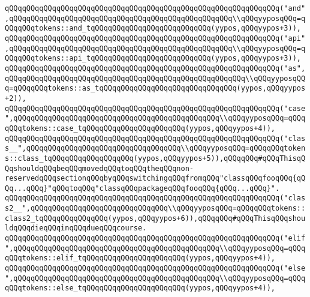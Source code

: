 \verb|qQQqqQQqqQQqqQQqqQQqqQQqqQQqqQQqqQQqqQQqqQQqqQQqqQQqqQQqqQQqqQQq("and",qQQqqQQqqQQqqQQqqQQqqQQqqQQqqQQqqQQqqQQqqQQqqQQqqQQq\\qQQqyyposqQQq=qQQqqQQqtokens::and_tqQQqqQQqqQQqqQQqqQQqqQQqqQQq(yypos,qQQqyypos+3)),|\newline
\verb|qQQqqQQqqQQqqQQqqQQqqQQqqQQqqQQqqQQqqQQqqQQqqQQqqQQqqQQqqQQqqQQq("api",qQQqqQQqqQQqqQQqqQQqqQQqqQQqqQQqqQQqqQQqqQQqqQQqqQQq\\qQQqyyposqQQq=qQQqqQQqtokens::api_tqQQqqQQqqQQqqQQqqQQqqQQqqQQq(yypos,qQQqyypos+3)),|\newline
\verb|qQQqqQQqqQQqqQQqqQQqqQQqqQQqqQQqqQQqqQQqqQQqqQQqqQQqqQQqqQQqqQQq("as",qQQqqQQqqQQqqQQqqQQqqQQqqQQqqQQqqQQqqQQqqQQqqQQqqQQqqQQq\\qQQqyyposqQQq=qQQqqQQqtokens::as_tqQQqqQQqqQQqqQQqqQQqqQQqqQQqqQQq(yypos,qQQqyypos+2)),|\newline
\verb|qQQqqQQqqQQqqQQqqQQqqQQqqQQqqQQqqQQqqQQqqQQqqQQqqQQqqQQqqQQqqQQq("case",qQQqqQQqqQQqqQQqqQQqqQQqqQQqqQQqqQQqqQQqqQQqqQQq\\qQQqyyposqQQq=qQQqqQQqtokens::case_tqQQqqQQqqQQqqQQqqQQqqQQq(yypos,qQQqyypos+4)),|\newline
\verb|qQQqqQQqqQQqqQQqqQQqqQQqqQQqqQQqqQQqqQQqqQQqqQQqqQQqqQQqqQQqqQQq("class__",qQQqqQQqqQQqqQQqqQQqqQQqqQQqqQQqqQQq\\qQQqyyposqQQq=qQQqqQQqtokens::class_tqQQqqQQqqQQqqQQqqQQq(yypos,qQQqyypos+5)),qQQqqQQq#qQQqThisqQQqshouldqQQqbeqQQqmovedqQQqtoqQQqtheqQQqnon-reservedqQQqsectionqQQqbyqQQqswitchingqQQqfromqQQq"classqQQqfooqQQq{qQQq...qQQq}"qQQqtoqQQq"classqQQqpackageqQQqfooqQQq{qQQq...qQQq}".|\newline
\verb|qQQqqQQqqQQqqQQqqQQqqQQqqQQqqQQqqQQqqQQqqQQqqQQqqQQqqQQqqQQqqQQq("class2__",qQQqqQQqqQQqqQQqqQQqqQQqqQQqqQQq\\qQQqyyposqQQq=qQQqqQQqtokens::class2_tqQQqqQQqqQQqqQQq(yypos,qQQqyypos+6)),qQQqqQQq#qQQqThisqQQqshouldqQQqdieqQQqinqQQqdueqQQqcourse.|\newline
\verb|qQQqqQQqqQQqqQQqqQQqqQQqqQQqqQQqqQQqqQQqqQQqqQQqqQQqqQQqqQQqqQQq("elif",qQQqqQQqqQQqqQQqqQQqqQQqqQQqqQQqqQQqqQQqqQQqqQQq\\qQQqyyposqQQq=qQQqqQQqtokens::elif_tqQQqqQQqqQQqqQQqqQQqqQQq(yypos,qQQqyypos+4)),|\newline
\verb|qQQqqQQqqQQqqQQqqQQqqQQqqQQqqQQqqQQqqQQqqQQqqQQqqQQqqQQqqQQqqQQq("else",qQQqqQQqqQQqqQQqqQQqqQQqqQQqqQQqqQQqqQQqqQQqqQQq\\qQQqyyposqQQq=qQQqqQQqtokens::else_tqQQqqQQqqQQqqQQqqQQqqQQq(yypos,qQQqyypos+4)),|\newline
